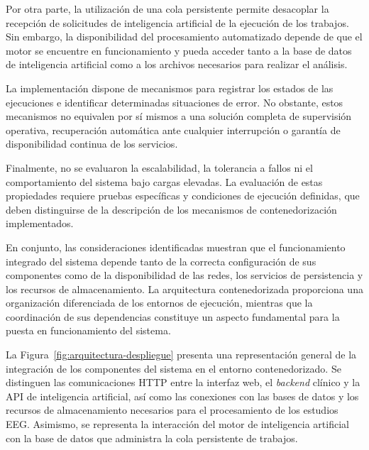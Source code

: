 Por otra parte, la utilización de una cola persistente
permite desacoplar la recepción de solicitudes de
inteligencia artificial de la ejecución de los trabajos.
Sin embargo, la disponibilidad del procesamiento
automatizado depende de que el motor se encuentre en
funcionamiento y pueda acceder tanto a la base de datos
de inteligencia artificial como a los archivos necesarios
para realizar el análisis.

La implementación dispone de mecanismos para registrar
los estados de las ejecuciones e identificar determinadas
situaciones de error. No obstante, estos mecanismos no
equivalen por sí mismos a una solución completa de
supervisión operativa, recuperación automática ante
cualquier interrupción o garantía de disponibilidad
continua de los servicios.

Finalmente, no se evaluaron la escalabilidad, la tolerancia
a fallos ni el comportamiento del sistema bajo cargas elevadas.
La evaluación de estas propiedades requiere pruebas
específicas y condiciones de ejecución definidas,
que deben distinguirse de la descripción de los
mecanismos de contenedorización implementados.

En conjunto, las consideraciones identificadas muestran
que el funcionamiento integrado del sistema depende
tanto de la correcta configuración de sus componentes
como de la disponibilidad de las redes, los servicios
de persistencia y los recursos de almacenamiento.
La arquitectura contenedorizada proporciona una
organización diferenciada de los entornos de ejecución,
mientras que la coordinación de sus dependencias
constituye un aspecto fundamental para la puesta
en funcionamiento del sistema.

La Figura~\ref{fig:arquitectura-despliegue}
presenta una representación general de la integración
de los componentes del sistema en el entorno
contenedorizado. Se distinguen las comunicaciones
HTTP entre la interfaz web, el \textit{backend} clínico y
la API de inteligencia artificial, así como las
conexiones con las bases de datos y los recursos
de almacenamiento necesarios para el procesamiento
de los estudios EEG. Asimismo, se representa
la interacción del motor de inteligencia artificial
con la base de datos que administra la cola
persistente de trabajos.


